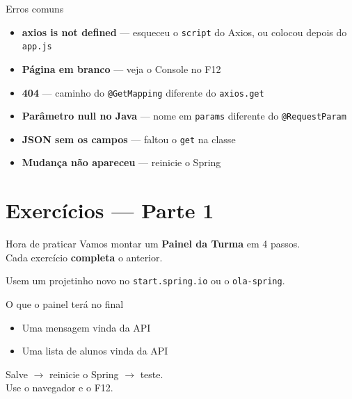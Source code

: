 \documentclass[aspectratio=169,11pt]{beamer}
\begin{document}
\begin{frame}{Erros comuns}
  \begin{itemize}
    \item \textbf{axios is not defined} --- esqueceu o
      \texttt{script} do Axios, ou colocou depois do
      \texttt{app.js}
    \item \textbf{Página em branco} --- veja o Console no F12
    \item \textbf{404} --- caminho do \texttt{@GetMapping}
      diferente do \texttt{axios.get}
    \item \textbf{Parâmetro null no Java} --- nome em
      \texttt{params} diferente do \texttt{@RequestParam}
    \item \textbf{JSON sem os campos} --- faltou o \texttt{get}
      na classe
    \item \textbf{Mudança não apareceu} --- reinicie o Spring
  \end{itemize}
\end{frame}

\section{Exercícios --- Parte 1}

\begin{frame}{Hora de praticar}
  Vamos montar um \textbf{Painel da Turma} em 4 passos.\\
  Cada exercício \textbf{completa} o anterior.

  \vspace{0.5em}
  Usem um projetinho novo no \texttt{start.spring.io}
  ou o \texttt{ola-spring}.

  \vspace{0.5em}
  \begin{block}{O que o painel terá no final}
    \begin{itemize}
      \item Uma mensagem vinda da API
      \item Uma lista de alunos vinda da API
    \end{itemize}
  \end{block}

  \vspace{0.4em}
  Salve $\rightarrow$ reinicie o Spring $\rightarrow$ teste.\\
  Use o navegador e o F12.
\end{frame}
\end{document}
